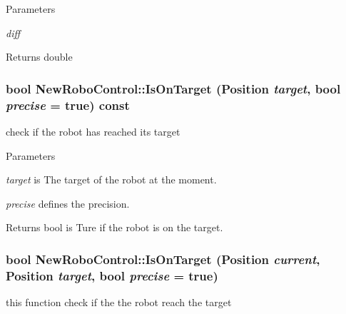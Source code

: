 \begin{DoxyParams}{Parameters}
\item[{\em diff}]\end{DoxyParams}
\begin{DoxyReturn}{Returns}
double 
\end{DoxyReturn}
\hypertarget{classNewRoboControl_a77b0e86bef15f3b1fb6cf98d91c6a9b4}{
\subsubsection[{IsOnTarget}]{\setlength{\rightskip}{0pt plus 5cm}bool NewRoboControl::IsOnTarget (Position {\em target}, \/  bool {\em precise} = {\ttfamily true}) const}}
\label{classNewRoboControl_a77b0e86bef15f3b1fb6cf98d91c6a9b4}


check if the robot has reached its target 


\begin{DoxyParams}{Parameters}
\item[{\em target}]is The target of the robot at the moment. \item[{\em precise}]defines the precision. \end{DoxyParams}
\begin{DoxyReturn}{Returns}
bool is Ture if the robot is on the target. 
\end{DoxyReturn}
\hypertarget{classNewRoboControl_a106c7ccc03f05693a07da1235ab0b17f}{
\subsubsection[{IsOnTarget}]{\setlength{\rightskip}{0pt plus 5cm}bool NewRoboControl::IsOnTarget (Position {\em current}, \/  Position {\em target}, \/  bool {\em precise} = {\ttfamily true})}}
\label{classNewRoboControl_a106c7ccc03f05693a07da1235ab0b17f}


this function check if the the robot reach the target 


